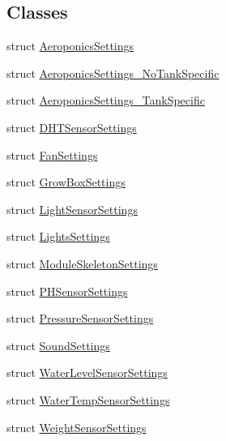 \subsection*{Classes}
\begin{DoxyCompactItemize}
\item 
struct \hyperlink{struct_settings_1_1_aeroponics_settings}{Aeroponics\+Settings}
\item 
struct \hyperlink{struct_settings_1_1_aeroponics_settings___no_tank_specific}{Aeroponics\+Settings\+\_\+\+No\+Tank\+Specific}
\item 
struct \hyperlink{struct_settings_1_1_aeroponics_settings___tank_specific}{Aeroponics\+Settings\+\_\+\+Tank\+Specific}
\item 
struct \hyperlink{struct_settings_1_1_d_h_t_sensor_settings}{D\+H\+T\+Sensor\+Settings}
\item 
struct \hyperlink{struct_settings_1_1_fan_settings}{Fan\+Settings}
\item 
struct \hyperlink{struct_settings_1_1_grow_box_settings}{Grow\+Box\+Settings}
\item 
struct \hyperlink{struct_settings_1_1_light_sensor_settings}{Light\+Sensor\+Settings}
\item 
struct \hyperlink{struct_settings_1_1_lights_settings}{Lights\+Settings}
\item 
struct \hyperlink{struct_settings_1_1_module_skeleton_settings}{Module\+Skeleton\+Settings}
\item 
struct \hyperlink{struct_settings_1_1_p_h_sensor_settings}{P\+H\+Sensor\+Settings}
\item 
struct \hyperlink{struct_settings_1_1_pressure_sensor_settings}{Pressure\+Sensor\+Settings}
\item 
struct \hyperlink{struct_settings_1_1_sound_settings}{Sound\+Settings}
\item 
struct \hyperlink{struct_settings_1_1_water_level_sensor_settings}{Water\+Level\+Sensor\+Settings}
\item 
struct \hyperlink{struct_settings_1_1_water_temp_sensor_settings}{Water\+Temp\+Sensor\+Settings}
\item 
struct \hyperlink{struct_settings_1_1_weight_sensor_settings}{Weight\+Sensor\+Settings}
\end{DoxyCompactItemize}

